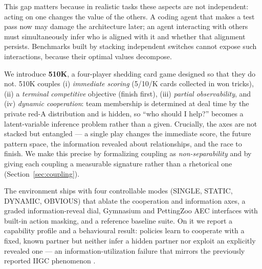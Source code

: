 \documentclass{article}
\begin{document}
This gap matters because in realistic tasks these aspects are not independent:
acting on one changes the value of the others. A coding agent that makes a test
pass now may damage the architecture later; an agent interacting with others
must simultaneously infer who is aligned with it and whether that alignment
persists. Benchmarks built by stacking independent switches cannot expose such
interactions, because their optimal values decompose.

We introduce \textbf{510K}, a four-player shedding card game designed so that
they do not. 510K couples (i) \emph{immediate scoring} (5/10/K cards collected
in won tricks), (ii) a \emph{terminal competitive} objective (finish first),
(iii) \emph{partial observability}, and (iv) \emph{dynamic cooperation}: team
membership is determined at deal time by the private red-A distribution and is
hidden, so ``who should I help?'' becomes a latent-variable inference problem
rather than a given. Crucially, the axes are not stacked but entangled --- a
single play changes the immediate score, the future pattern space, the
information revealed about relationships, and the race to finish. We make this
precise by formalizing coupling as \emph{non-separability} and by giving each
coupling a measurable signature rather than a rhetorical one
(Section~\ref{sec:coupling}).

The environment ships with four controllable modes (SINGLE, STATIC, DYNAMIC,
OBVIOUS) that ablate the cooperation and information axes, a graded
information-reveal dial, Gymnasium and PettingZoo AEC interfaces with built-in
action masking, and a reference baseline suite. On it we report a capability
profile and a behavioural result: policies learn to cooperate with a fixed,
known partner but neither infer a hidden partner nor exploit an explicitly
revealed one --- an information-utilization failure that mirrors the previously
reported IIGC phenomenon \citep{iigc}.
\end{document}
